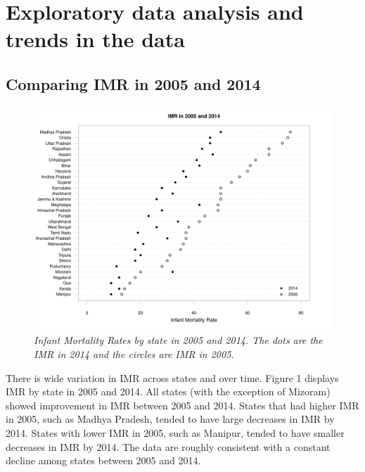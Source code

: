 \documentclass{article}
\begin{document}
\section{Exploratory data analysis and trends in the data}
\subsection{Comparing IMR in 2005 and 2014}
\begin{figure}[H]
   \begin{center}
   \includegraphics[scale = .8]{compare_05_14.pdf}
   \end{center}
   \caption{\emph{Infant Mortality Rates by state in 2005 and 2014. The dots are the IMR in 2014 and the circles are IMR in 2005.}}
\end{figure}
There is wide variation in IMR across states and over time. Figure 1 displays IMR by state in 2005 and 2014.  All states (with the exception of Mizoram) showed improvement in IMR between 2005 and 2014.  States that had higher IMR in 2005, such as Madhya Pradesh, tended to have large decreases in IMR by 2014.  States with lower IMR in 2005, such as Manipur, tended to have smaller  decreases in IMR by 2014.  The data are roughly consistent with a constant decline among states between 2005 and 2014.
\end{document}

